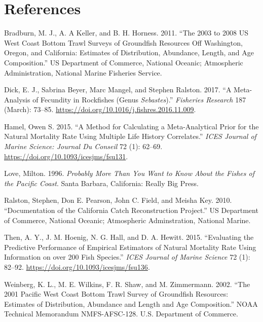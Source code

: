 \documentclass[11pt,
  english,
  a4paper,
]{article}
\begin{document}
\tagmcend\tagstructend

\clearpage


\hypertarget{references}{%
\section{References}\label{references}}

\leavevmode\tagmcend\tagstructend

\hypertarget{refs}{}
\begin{cslreferences}
\leavevmode\hypertarget{ref-bradburn_2003_2011}{}%
Bradburn, M. J., A. A Keller, and B. H. Horness. 2011. ``The 2003 to 2008 US West Coast Bottom Trawl Surveys of Groundfish Resources Off Washington, Oregon, and California: Estimates of Distribution, Abundance, Length, and Age Composition.'' US Department of Commerce, National Oceanic; Atmospheric Administration, National Marine Fisheries Service.

\leavevmode\hypertarget{ref-dick_meta-analysis_2017}{}%
Dick, E. J., Sabrina Beyer, Marc Mangel, and Stephen Ralston. 2017. ``A Meta-Analysis of Fecundity in Rockfishes (Genus \emph{Sebastes}).'' \emph{Fisheries Research} 187 (March): 73--85. \url{https://doi.org/10.1016/j.fishres.2016.11.009}.

\leavevmode\hypertarget{ref-hamel_method_2015}{}%
Hamel, Owen S. 2015. ``A Method for Calculating a Meta-Analytical Prior for the Natural Mortality Rate Using Multiple Life History Correlates.'' \emph{ICES Journal of Marine Science: Journal Du Conseil} 72 (1): 62--69. \url{https://doi.org/10.1093/icesjms/fsu131}.

\leavevmode\hypertarget{ref-love_milton_probably_1996}{}%
Love, Milton. 1996. \emph{Probably More Than You Want to Know About the Fishes of the Pacific Coast}. Santa Barbara, California: Really Big Press.

\leavevmode\hypertarget{ref-ralston_documentation_2010}{}%
Ralston, Stephen, Don E. Pearson, John C. Field, and Meisha Key. 2010. ``Documentation of the California Catch Reconstruction Project.'' US Department of Commerce, National Oceanic; Atmospheric Adminstration, National Marine.

\leavevmode\hypertarget{ref-then_evaluating_2015-1}{}%
Then, A. Y., J. M. Hoenig, N. G. Hall, and D. A. Hewitt. 2015. ``Evaluating the Predictive Performance of Empirical Estimators of Natural Mortality Rate Using Information on over 200 Fish Species.'' \emph{ICES Journal of Marine Science} 72 (1): 82--92. \url{https://doi.org/10.1093/icesjms/fsu136}.

\leavevmode\hypertarget{ref-weinberg_2001_2002}{}%
Weinberg, K. L., M. E. Wilkins, F. R. Shaw, and M. Zimmermann. 2002. ``The 2001 Pacific West Coast Bottom Trawl Survey of Groundfish Resources: Estimates of Distribution, Abundance and Length and Age Composition.'' NOAA Technical Memorandum NMFS-AFSC-128. U.S. Department of Commerce.
\end{cslreferences}
\end{document}
